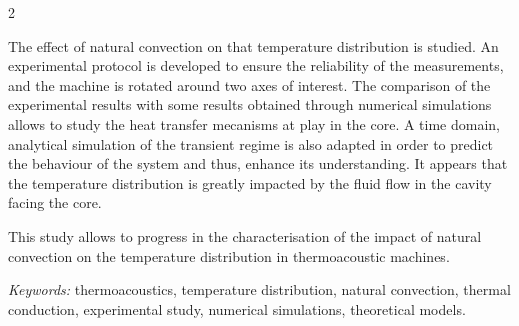 \documentclass[a4paper,11pt]{book}
\begin{document}
{\begin{multicols}{2}

The effect of natural convection on that temperature distribution is studied. An experimental protocol is developed to ensure the reliability of the measurements, and the machine is rotated around two axes of interest. The comparison of the experimental results with some results obtained through numerical simulations allows to study the heat transfer mecanisms at play in the core. A time domain, analytical simulation of the transient regime is also adapted in order to predict the behaviour of the system and thus, enhance its understanding. It appears that the temperature distribution is greatly impacted by the fluid flow in the cavity facing the core.

This study allows to progress in the characterisation of the impact of natural convection on the temperature distribution in thermoacoustic machines.
\end{multicols}
\bigskip

{\large \textit{Keywords:}} thermoacoustics, temperature distribution, natural convection, thermal conduction, experimental study, numerical simulations, theoretical models.

\vfill
}
\end{document}
